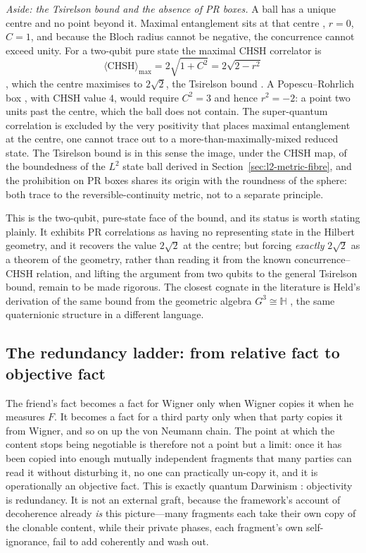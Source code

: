 \documentclass{article}
\begin{document}
\medskip
\noindent\emph{Aside: the Tsirelson bound and the absence of PR boxes.}
A ball has a unique centre and no point beyond it. Maximal entanglement sits at
that centre \autocite{MosseriDandoloff2001}, $r=0$, $C=1$, and because the
Bloch radius cannot be negative, the concurrence cannot exceed unity. For a
two-qubit pure state the maximal CHSH correlator is
\begin{equation}
  \langle\mathrm{CHSH}\rangle_{\max}=2\sqrt{1+C^{2}}=2\sqrt{2-r^{2}}  
\end{equation}
\autocite{VerstraeteWolf2002},
which the centre maximises to $2\sqrt{2}$, the Tsirelson bound
\autocite{Cirelson1980QuantumInequality}. A Popescu--Rohrlich box \autocite{PopescuRohrlich1994},
with CHSH value $4$, would require $C^{2}=3$ and hence $r^{2}=-2$: a point two
units past the centre, which the ball does not contain. The super-quantum
correlation is excluded by the very positivity that places maximal entanglement
at the centre, one cannot trace out to a more-than-maximally-mixed reduced
state. The Tsirelson bound is in this sense the image, under the CHSH map, of the
boundedness of the $L^{2}$ state ball derived in
Section~\ref{sec:l2-metric-fibre}, and the prohibition on PR boxes shares its
origin with the roundness of the sphere: both trace to the reversible-continuity
metric, not to a separate principle.

\noindent This is the two-qubit, pure-state face of the bound, and its status is
worth stating plainly. It exhibits PR correlations as having no representing state
in the Hilbert geometry, and it recovers the value $2\sqrt{2}$ at the centre; but
forcing \emph{exactly} $2\sqrt{2}$ as a theorem of the geometry, rather than
reading it from the known concurrence--CHSH relation, and lifting the argument
from two qubits to the general Tsirelson bound, remain to be made rigorous. The
closest cognate in the literature is Held's derivation of the same bound from the
geometric algebra $G^{3}\cong\mathbb{H}$ \autocite{Held2021}, the same
quaternionic structure in a different language.

\subsection{The redundancy ladder: from relative fact to objective fact}
\label{sec:wf-redundancy}

The friend's fact becomes a fact for Wigner only when Wigner copies it when he
measures $F$. It becomes a fact for a third party only when that party copies it
from Wigner, and so on up the von Neumann chain. The point at which the content
stops being negotiable is therefore not a point but a limit: once it has been
copied into enough mutually independent fragments that many parties can read it
without disturbing it, no one can practically un-copy it, and it is operationally
an objective fact. This is exactly quantum Darwinism \autocite{zureck_2009}:
objectivity is redundancy. It is not an external graft, because the framework's
account of decoherence already \emph{is} this picture---many fragments each take
their own copy of the clonable content, while their private phases, each
fragment's own self-ignorance, fail to add coherently and wash out.
\end{document}
